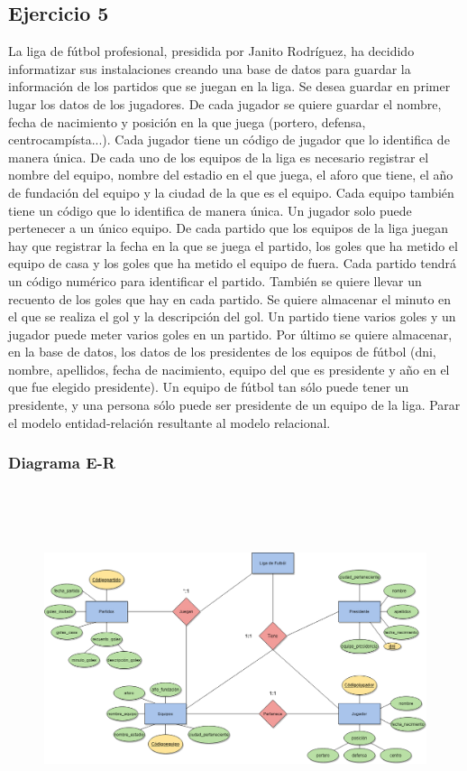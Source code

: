 \documentclass[a4paper, 12pt]{article}
\begin{document}
\begin{justify}
        \subsection{Ejercicio 5}
        \justify
        La liga de fútbol profesional, presidida por Janito Rodríguez, ha decidido informatizar sus instalaciones creando una base de datos para guardar la información de los partidos que se juegan en la liga.
        Se desea guardar en primer lugar los datos de los jugadores. De cada jugador se quiere guardar el nombre, fecha de nacimiento y posición en la que juega (portero, defensa, centrocampísta...). Cada jugador
        tiene un código de jugador que lo identifica de manera única. De cada uno de los equipos de la liga es necesario registrar el nombre del equipo, nombre del estadio en el que juega, el aforo que tiene, el año
        de fundación del equipo y la ciudad de la que es el equipo. Cada equipo también tiene un código que lo identifica de manera única. Un jugador solo puede pertenecer a un único equipo. De cada partido que los equipos
        de la liga juegan hay que registrar la fecha en la que se juega el partido, los goles que ha metido el equipo de casa y los goles que ha metido el equipo de fuera. Cada partido tendrá un código numérico para identificar
        el partido. También se quiere llevar un recuento de los goles que hay en cada partido. Se quiere almacenar el minuto en el que se realiza el gol y la descripción del gol. Un partido tiene varios goles y un jugador
        puede meter varios goles en un partido. Por último se quiere almacenar, en la base de datos, los datos de los presidentes de los equipos de fútbol (dni, nombre, apellidos, fecha de nacimiento, equipo del que es presidente
        y año en el que fue elegido presidente). Un equipo de fútbol tan sólo puede tener un presidente, y una persona sólo puede ser presidente de un equipo de la liga. Parar el modelo entidad-relación resultante al modelo relacional.
        \subsubsection{Diagrama E-R}
        \begin{figure}[H]
            \centering
            \includegraphics[width=16cm,height=10cm]{er5.png}
        \end{figure}

\end{justify}
\end{document}

